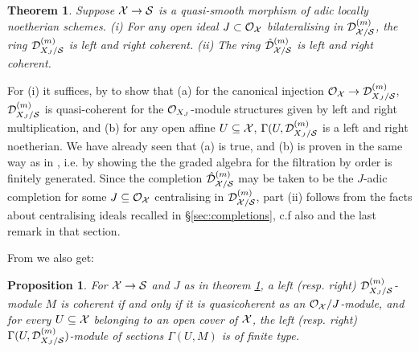 \documentclass{article}
\theoremstyle{change}
\newtheorem{thm}[subsubsection]{Theorem}
\newtheorem{prop}[subsubsection]{Proposition}
\numberwithin{equation}{subsubsection}
\newcommand{\demobox}{\vrule height6pt width6pt depth0pt}
\newenvironment{demo}{\noindent{\it Proof.}}
{{\unskip\nobreak\hfil\qquad
\demobox\parfillskip=0pt\par}
\medskip}
\begin{document}
\begin{thm}\label{thm:coherence-finite-level}
  Suppose ${\cal X}\to{\cal S}$ is a quasi-smooth morphism of adic locally
  noetherian schemes. (i) For any open ideal $J\subset{\cal O}_{\cal X}$
  bilateralising in ${{\cal D}}^{({m})}_{{\cal X}/{\cal S}}$, the ring
  ${{\cal D}}^{({m})}_{X_J/{\cal S}}$ is left and right coherent. (ii) The ring
  ${\hat{\cal D}}^{({m})}_{{\cal X}/{\cal S}}$ is left and right coherent.
\end{thm}
\begin{demo}
  For (i) it suffices, by \cite[Prop. 3.1.3]{berthelot:1996} to show
  that (a) for the canonical injection
  ${\cal O}_{\cal X}\to{{\cal D}}^{({m})}_{X_J/{\cal S}}$, ${{\cal D}}^{({m})}_{X_J/{\cal S}}$ is
  quasi-coherent for the ${\cal O}_{X_J}$-module structures given by left
  and right multiplication, and (b) for any open affine $U\subseteq{\cal X}$,
  $\Gamma(U,{{\cal D}}^{({m})}_{X_J/{\cal S}}$ is a left and right noetherian. We
  have already seen that (a) is true, and (b) is proven in the same
  way as in \cite[Cor. 2.2.5 (ii)]{berthelot:1996}, i.e. by showing
  the the graded algebra for the filtration by order is finitely
  generated. Since the completion ${\hat{\cal D}}^{({m})}_{{\cal X}/{\cal S}}$ may be
  taken to be the $J$-adic completion for some $J\subseteq{\cal O}_{\cal X}$
  centralising in ${{\cal D}}^{({m})}_{{\cal X}/{\cal S}}$, part (ii) follows from the
  facts about centralising ideals recalled in \S\ref{sec:completions},
  c.f also \cite[\S3.2.3]{berthelot:1996} and the last remark in that
  section.
\end{demo}

From \cite[Prop. 3.1.3]{berthelot:1996} we also get:

\begin{prop}\label{prop:coherent-modules-level-m}
  For ${\cal X}\to{\cal S}$ and $J$ as in theorem
  \ref{thm:coherence-finite-level}, a left (resp. right)
  ${{\cal D}}^{({m})}_{X_J/{\cal S}}$-module $M$ is coherent if and only if it is
  quasicoherent as an ${\cal O}_{\cal X}/J$-module, and for every $U\subseteq{\cal X}$
  belonging to an open cover of ${\cal X}$, the left (resp. right)
  $\Gamma(U,{{\cal D}}^{({m})}_{X_J/{\cal S}})$-module of sections $\Gamma(U,M)$ is
  of finite type.
\end{prop}
\end{document}
